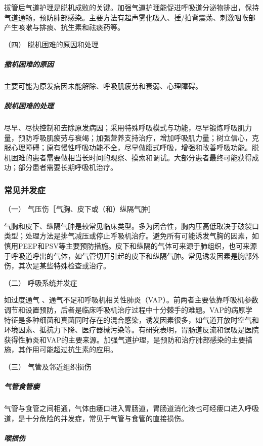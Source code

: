 拔管后气道护理是脱机成败的关键。加强气道护理能促进呼吸道分泌物排出，保持气道通畅，预防肺部感染。主要方法有超声雾化吸入、捶/拍背震荡、刺激咽喉部产生咳嗽与排痰、抗生素和祛痰药等。

\hypertarget{text00371.htmlux5cux23CHP16-3-5-3-4}{}
（四） 脱机困难的原因和处理

\subparagraph{撤机困难的原因}

主要可能为原发病因未能解除、呼吸肌疲劳和衰弱、心理障碍。

\subparagraph{脱机困难的处理}

尽早、尽快控制和去除原发病因；采用特殊呼吸模式与功能，尽早锻炼呼吸肌力量，预防呼吸肌疲劳与衰竭；加强营养支持治疗，增加呼吸肌力量；树立信心，克服心理障碍；原有慢性呼吸功能不全，尽早做腹式呼吸，增强和改善呼吸功能。脱机困难的患者需要做相当长时间的观察、摸索和调试。大部分患者最终可能获得成功；部分患者需要长期呼吸机治疗。

\subsubsection{常见并发症}

\hypertarget{text00371.htmlux5cux23CHP16-3-5-4-1}{}
（一） 气压伤［气胸、皮下或（和）纵隔气肿］

气胸和皮下、纵隔气肿是较常见临床类型。多为闭合性，胸内压高低取决于破裂口类型；处理方法是排气减压或停止呼吸机治疗。避免所有可能诱发气胸的因素，如慎用PEEP和PSV等主要预防措施。皮下和纵隔的气体可来源于肺组织，也可来源于呼吸道呼出的气体，如气管切开引起的皮下和纵隔气肿。常见诱发因素是胸部外伤，其次是某些特殊检查或治疗。

\hypertarget{text00371.htmlux5cux23CHP16-3-5-4-2}{}
（二） 呼吸系统并发症

如过度通气
、通气不足和呼吸机相关性肺炎（VAP）。前两者主要依靠呼吸机参数调节和设置预防，后者是临床呼吸机治疗过程中十分棘手的难题。VAP的病原学特征是多种细菌和真菌同时存在的混合感染，诱发因素很多，如气道开放时空气和环境因素、抵抗力下降、医疗器械污染等。有研究表明，胃肠道反流和误吸是医院获得性肺炎和VAP的主要来源。加强气道护理，是预防和治疗肺部感染的主要措施，其作用可能超过抗生素的应用。

\hypertarget{text00371.htmlux5cux23CHP16-3-5-4-3}{}
（三） 气管及邻近组织损伤

\subparagraph{气管食管瘘}

气管与食管之间相通，气体由瘘口进入胃肠道，胃肠道消化液也可经瘘口进入呼吸道，是十分危险的并发症，常见于气管与食管的直接损伤。

\subparagraph{喉损伤}


